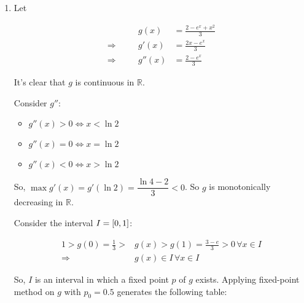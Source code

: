 \documentclass[../../../../Assignments]{subfiles}
\begin{document}
\begin{solution}
    \begin{enumerate}[label = \alph*)]
        \item Let

            \[\begin{aligned}
                &\quad&         g(x) &= \frac{2 - e^x + x^2}{3} \\
                \Rightarrow&&  g'(x) &= \frac{2x - e^x}{3} \\
                \Rightarrow&& g''(x) &= \frac{2 - e^x}{3}
            \end{aligned}\]

            It's clear that \(g\) is continuous in \(\mathbb{R}\).

            Consider \(g''\):

            \begin{itemize}
                \item \(g''(x) > 0 \iff x < \ln{2}\)
                \item \(g''(x) = 0 \iff x = \ln{2}\)
                \item \(g''(x) < 0 \iff x > \ln{2}\)
            \end{itemize}

            So, \(\max g'(x) = g'(\ln{2}) = \dfrac{\ln{4} - 2}{3} < 0\). So \(g\)
            is monotonically decreasing in \(\mathbb{R}\).

            Consider the interval \(I = \interval{0}{1}\):

            \[\]
            \[\begin{aligned}
                1 > g(0) = \frac{1}{3} > &g(x) > g(1) = \frac{3 - e}{3} > 0 \, \forall x \in I \\
                             \Rightarrow &g(x) \in I \, \forall x \in I
            \end{aligned}\]

            So, \(I\) is an interval in which a fixed point \(p\) of \(g\)
            exists. Applying fixed-point method on \(g\) with \(p_0 =
            \num{0.5}\) generates the following table:


\end{enumerate}
\end{solution}
\end{document}
